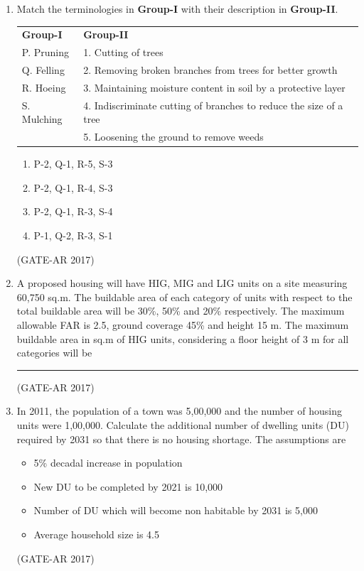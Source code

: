 \documentclass[a4paper,10pt]{article}
\begin{document}
\begin{enumerate}
    \item Match the terminologies in \textbf{Group-I} with their description in \textbf{Group-II}. \\
    \begin{tabular}{ l l }
	\textbf{Group-I} & \textbf{Group-II} \\
	P. Pruning & 1. Cutting of trees \\
	Q. Felling & 2. Removing broken branches from trees for better growth \\
	R. Hoeing & 3. Maintaining moisture content in soil by a protective layer \\
	S. Mulching & 4. Indiscriminate cutting of branches to reduce the size of a tree \\
	& 5. Loosening the ground to remove weeds \\
	\end{tabular}
	\begin{multicols}{2}
	\begin{enumerate}
        \item P-2, Q-1, R-5, S-3
        \item P-2, Q-1, R-4, S-3
        \item P-2, Q-1, R-3, S-4
        \item P-1, Q-2, R-3, S-1
    \end{enumerate}
	\end{multicols}
    \hfill (GATE-AR 2017)

	\item A proposed housing will have HIG, MIG and LIG units on a site measuring 60,750 sq.m. The buildable area of each category of units with respect to the total buildable area will be 30\%, 50\% and 20\% respectively. The maximum allowable FAR is 2.5, ground coverage 45\% and height 15 m. The maximum buildable area in sq.m of HIG units, considering a floor height of 3 m for all categories will be \rule{2cm}{0.4pt}
    \hfill (GATE-AR 2017)
    
    \item In 2011, the population of a town was 5,00,000 and the number of housing units were 1,00,000. Calculate the additional number of dwelling units (DU) required by 2031 so that there is no housing shortage. The assumptions are
    \begin{itemize}
    \item 5\% decadal increase in population
    \item New DU to be completed by 2021 is 10,000
    \item Number of DU which will become non habitable by 2031 is 5,000
    \item Average household size is 4.5 
    \end{itemize}
    \hfill (GATE-AR 2017)
    

\end{enumerate}
\end{document}
